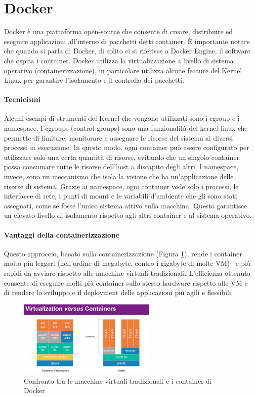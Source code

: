 \section{Docker}
\label{sec:docker}
Docker è una piattaforma open-source che consente di creare, distribuire ed eseguire applicazioni all'interno di pacchetti detti container. È importante notare che quando si parla di Docker, di solito ci si riferisce a Docker Engine, il software che ospita i container. Docker utilizza la virtualizzazione a livello di sistema operativo (containerizzazione), in particolare utilizza alcune feature del Kernel Linux per garantire l’isolamento e il controllo dei pacchetti.
\paragraph{Tecnicismi}
Alcuni esempi di strumenti del Kernel che vengono utilizzati sono i cgroup e i namespace. I cgroups (control groups) sono una funzionalità del kernel linux che permette di limitare, monitorare e assegnare le risorse del sistema ai diversi processi in esecuzione. In questo modo, ogni container può essere configurato per utilizzare solo una certa quantità di risorse, evitando che un singolo container possa consumare tutte le risorse dell’host a discapito degli altri.
I namespace, invece, sono un meccanismo che isola la visione che ha un’applicazione delle risorse di sistema. Grazie ai namespace, ogni container vede solo i processi, le interfacce di rete, i punti di mount e le variabili d’ambiente che gli sono stati assegnati, come se fosse l'unico sistema attivo sulla macchina. Questo garantisce un elevato livello di isolamento rispetto agli altri container e al sistema operativo. 
\paragraph{Vantaggi della containerizzazione}
Questo approccio, basato sulla containerizzazione (Figura \ref{fig:docker_containerization}), rende i container molto più leggeri (nell’ordine di megabyte, contro i gigabyte di molte VM)~\cite{ibm_docker} e più rapidi da avviare rispetto alle macchine virtuali tradizionali. L’efficienza ottenuta consente di eseguire molti più container sullo stesso hardware rispetto alle VM e di rendere lo sviluppo e il deployment delle applicazioni più agili e flessibili.

\begin{figure}[h]
    \centering
    \includegraphics[width=0.6\textwidth]{img/contvsvirt.png}
    \caption{Confronto tra le macchine virtuali tradizionali e i container di Docker}
    \label{fig:docker_containerization}
\end{figure}

